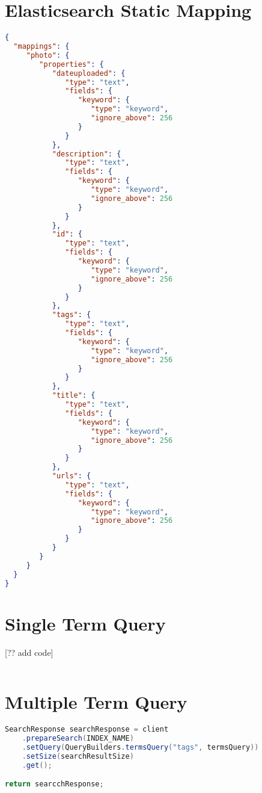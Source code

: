\section{Elasticsearch Static Mapping}
\begin{lstlisting}[language={json}, caption={The static Elasticsearch mapping used on the photo index in the experiment setup.}, label={ap:elasticsearch-mapping}]
{
  "mappings": {
     "photo": {
        "properties": {
           "dateuploaded": {
              "type": "text",
              "fields": {
                 "keyword": {
                    "type": "keyword",
                    "ignore_above": 256
                 }
              }
           },
           "description": {
              "type": "text",
              "fields": {
                 "keyword": {
                    "type": "keyword",
                    "ignore_above": 256
                 }
              }
           },
           "id": {
              "type": "text",
              "fields": {
                 "keyword": {
                    "type": "keyword",
                    "ignore_above": 256
                 }
              }
           },
           "tags": {
              "type": "text",
              "fields": {
                 "keyword": {
                    "type": "keyword",
                    "ignore_above": 256
                 }
              }
           },
           "title": {
              "type": "text",
              "fields": {
                 "keyword": {
                    "type": "keyword",
                    "ignore_above": 256
                 }
              }
           },
           "urls": {
              "type": "text",
              "fields": {
                 "keyword": {
                    "type": "keyword",
                    "ignore_above": 256
                 }
              }
           }
        }
     }
  }
}
\end{lstlisting}

\section{Single Term Query}
[?? add code]
\begin{lstlisting}[language={java}, caption={Java code used to search for a single term.}, label={ap:single-term-query}]

\end{lstlisting}

\section{Multiple Term Query}
\begin{lstlisting}[language={java}, caption={Java code used to search for multiple terms.}, label={ap:multiple-term-query}]
SearchResponse searchResponse = client
    .prepareSearch(INDEX_NAME)
    .setQuery(QueryBuilders.termsQuery("tags", termsQuery))
    .setSize(searchResultSize)
    .get();

return searcchResponse;
\end{lstlisting}

